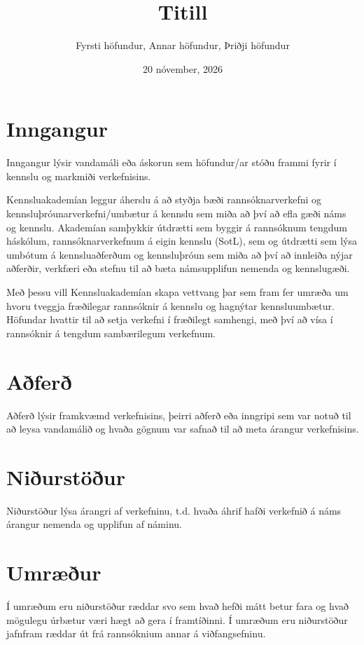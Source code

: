 \documentclass{kennsluakademia_conf}
\date{20 nóvember, 2026}
\title{Titill}
\author{%
Fyrsti höfundur\autid{1}{0000-0000-0000-0000},
Annar höfundur\autid{1}{0000-0000-0000-0000},
Þriðji höfundur\autid{2}{0000-0000-0000-0000}%
}
\affil{1}{Deild, háskóli}
\affil{2}{Önnur deild, háskóli}
\begin{document}
\maketitle


\section{Inngangur}\label{inngangur}

Inngangur lýsir vandamáli eða áskorun sem höfundur/ar stóðu frammi fyrir
í kennslu og markmiði verkefnisins.

Kennsluakademían leggur áherslu á að styðja bæði rannsóknarverkefni og
kennsluþróunarverkefni/umbætur á kennslu sem miða að því að efla gæði
náms og kennslu. Akademían samþykkir útdrætti sem byggir á rannsóknum
tengdum háskólum, rannsóknarverkefnum á eigin kennslu (SotL), sem og
útdrætti sem lýsa umbótum á kennsluaðferðum og kennsluþróun sem miða að
því að innleiða nýjar aðferðir, verkfæri eða stefnu til að bæta
námsupplifun nemenda og kennslugæði.

Með þessu vill Kennsluakademían skapa vettvang þar sem fram fer umræða
um hvoru tveggja fræðilegar rannsóknir á kennslu og hagnýtar
kennsluumbætur. Höfundar hvattir til að setja verkefni í fræðilegt
samhengi, með því að vísa í rannsóknir á tengdum sambærilegum verkefnum.

\section{Aðferð}\label{auxf0feruxf0}

Aðferð lýsir framkvæmd verkefnisins, þeirri aðferð eða inngripi sem var
notuð til að leysa vandamálið og hvaða gögnum var safnað til að meta
árangur verkefnisins.

\section{Niðurstöður}\label{niuxf0urstuxf6uxf0ur}

Niðurstöður lýsa árangri af verkefninu, t.d. hvaða áhrif hafði verkefnið
á náms árangur nemenda og upplifun af náminu.

\section{Umræður}\label{umruxe6uxf0ur}

Í umræðum eru niðurstöður ræddar svo sem hvað hefði mátt betur fara og
hvað mögulegu úrbætur væri hægt að gera í framtíðinni. Í umræðum eru
niðurstöður jafnfram ræddar út frá rannsóknium annar á viðfangsefninu.

\nocite{*}


\end{document}
